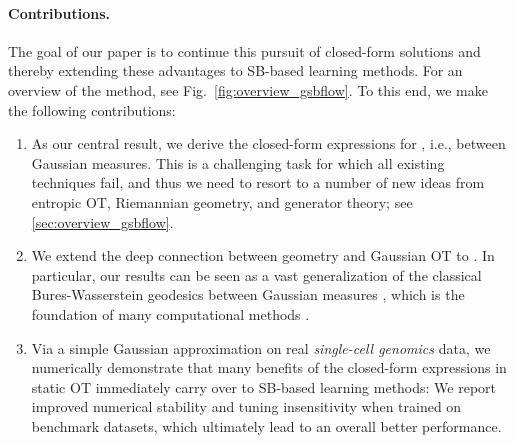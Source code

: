 \paragraph{Contributions.}
The goal of our paper is to continue this pursuit of closed-form solutions and thereby extending these advantages to \acrshort{SB}-based learning methods. For an overview of the method, see Fig.~\ref{fig:overview_gsbflow}. To this end, we make the following contributions: \vspace{8pt}
\begin{enumerate}[leftmargin=.4cm,itemsep=.0cm,topsep=.0cm]
\item As our central result, we derive the closed-form expressions for , i.e., between Gaussian measures. This is a challenging task for which all existing techniques fail, and thus we need to resort to a number of new ideas from entropic \acrshort{OT}, Riemannian geometry, and generator theory; see \cref{sec:overview_gsbflow}.

\item We extend the deep connection between geometry and Gaussian \acrshort{OT} to . In particular, our results can be seen as a vast generalization of the classical Bures-Wasserstein geodesics between Gaussian measures \citep{takatsu2010wasserstein, bhatia2019bures}, which is the foundation of many computational methods \citep{chewi2020gradient, altschuler2021averaging, han2021riemannian}.

\item Via a simple Gaussian approximation on real \emph{single-cell genomics} data, we numerically demonstrate that many benefits of the closed-form expressions in static \acrshort{OT} immediately carry over to \acrshort{SB}-based learning methods: We report improved numerical stability and tuning insensitivity when trained on benchmark datasets, which ultimately lead to an overall better performance.

\end{enumerate}


